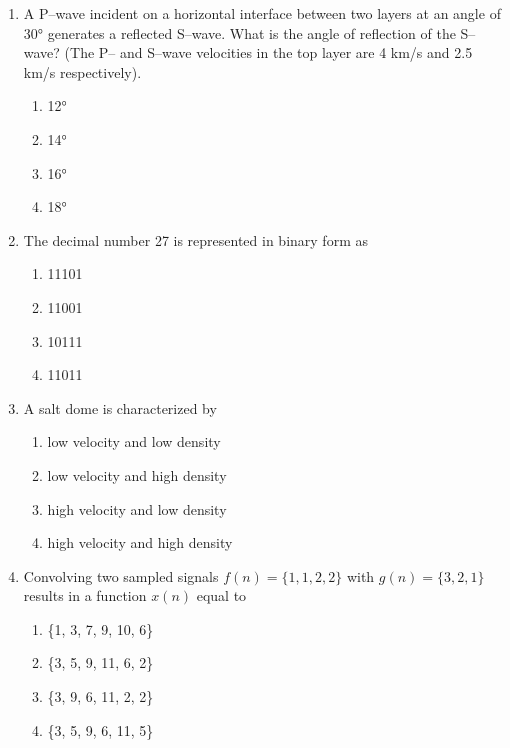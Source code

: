 \documentclass[journal,12pt,onecolumn]{IEEEtran}
\theoremstyle{remark}
\begin{document}
\begin{enumerate}[resume]
\item A P--wave incident on a horizontal interface between two layers at an angle of 30° generates a reflected S--wave. What is the angle of reflection of the S--wave? (The P-- and S--wave velocities in the top layer are 4 km/s and 2.5 km/s respectively).

\begin{multicols}{4}
\begin{enumerate}
\item 12°  
\item 14°  
\item 16°  
\item 18°  
\end{enumerate}
\end{multicols}
\vspace{0.5cm}

\item The decimal number 27 is represented in binary form as

\begin{multicols}{4}
\begin{enumerate}
\item 11101  
\item 11001  
\item 10111  
\item 11011  
\end{enumerate}
\end{multicols}
\vspace{0.5cm}

\item A salt dome is characterized by
\begin{enumerate}

\item low velocity and low density  
\item low velocity and high density  
\item high velocity and low density  
\item high velocity and high density  
\vspace{0.5cm}
\end{enumerate}

\item Convolving two sampled signals $f(n) = \{1,1,2,2\}$ with $g(n) = \{3,2,1\}$ results in a function $x(n)$ equal to

\begin{multicols}{2}
\begin{enumerate}
\item \{1, 3, 7, 9, 10, 6\}  
\item \{3, 5, 9, 11, 6, 2\}  
\item \{3, 9, 6, 11, 2, 2\}  
\item \{3, 5, 9, 6, 11, 5\}  
\end{enumerate}
\end{multicols}
\vspace{0.5cm}


\end{enumerate}
\end{document}
